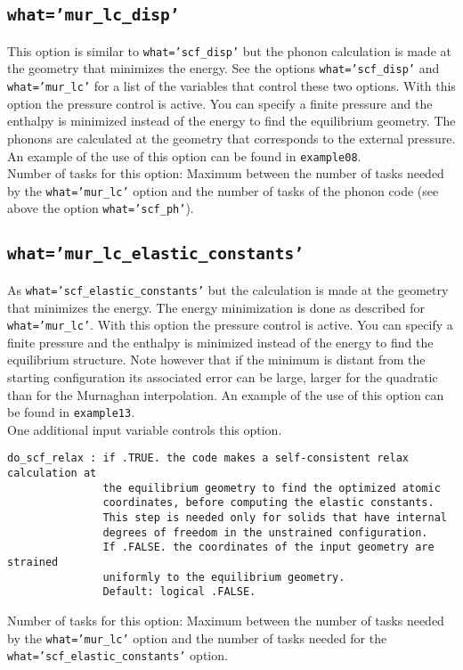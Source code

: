 \documentclass[12pt,a4paper]{article}
\begin{document}
\subsection{\color{web-blue}\texttt{what='mur\_lc\_disp'}}
This option is similar to \texttt{what='scf\_disp'} but the phonon calculation
is made at the geometry that minimizes the energy.
See the options \texttt{what='scf\_disp'} and \texttt{what='mur\_lc'} for a
list of the variables that control these two options. 
With this option the pressure control is active. You can specify a
finite pressure and the enthalpy is minimized instead of the
energy to find the equilibrium geometry. The phonons are calculated
at the geometry that corresponds to the external pressure.
An example of the use of this option can be found in \texttt{example08}. \\
Number of tasks for this option: Maximum between the number of tasks  
needed by the \texttt{what='mur\_lc'} option and the number
of tasks of the phonon code (see above the option \texttt{what='scf\_ph'}).

\subsection{\color{web-blue}\texttt{what='mur\_lc\_elastic\_constants'}}
As \texttt{what='scf\_elastic\_constants'} but the calculation is made at the
geometry that minimizes the energy. The energy minimization is 
done as described for \texttt{what='mur\_lc'}. 
With this option the pressure control is active. You can specify a
finite pressure and the enthalpy is minimized instead of the
energy to find the equilibrium structure. Note however that if the 
minimum is distant from the starting configuration its associated error 
can be large, larger for the quadratic than for the Murnaghan interpolation. 
An example of the use of this 
option can be found in \texttt{example13}. \\
One additional input variable controls this option.
\begin{verbatim}
do_scf_relax : if .TRUE. the code makes a self-consistent relax calculation at
               the equilibrium geometry to find the optimized atomic 
               coordinates, before computing the elastic constants.
               This step is needed only for solids that have internal
               degrees of freedom in the unstrained configuration. 
               If .FALSE. the coordinates of the input geometry are strained 
               uniformly to the equilibrium geometry.
               Default: logical .FALSE. 
\end{verbatim}
Number of tasks for this option: Maximum between the number of tasks
needed by the \texttt{what='mur\_lc'} option and the number of tasks
needed for the \texttt{what='scf\_elastic\_constants'} option.
\end{document}
